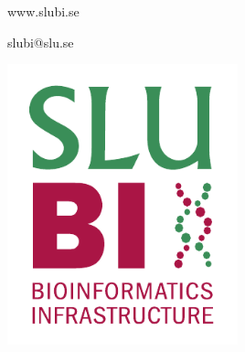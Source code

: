 \begin{center}
www.slubi.se

slubi@slu.se
\end{center}

\vfill


\begin{center}
\includegraphics[width=0.5\textwidth]{images/logos/Partnerlogos/slubi.pdf}
\end{center}

\vfill